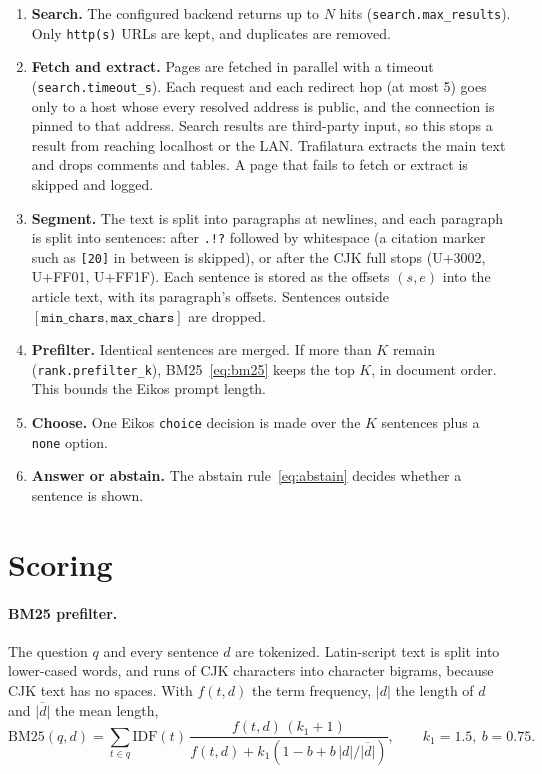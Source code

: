 \documentclass[11pt,a4paper]{article}
\newcommand{\code}[1]{\texttt{#1}}
\begin{document}
\begin{enumerate}
  \item \textbf{Search.} The configured backend returns up to $N$ hits (\code{search.max\_results}). Only
        \code{http(s)} URLs are kept, and duplicates are removed.
  \item \textbf{Fetch and extract.} Pages are fetched in parallel with a timeout (\code{search.timeout\_s}).
        Each request and each redirect hop (at most 5) goes only to a host whose every resolved address is public, and the connection is pinned to that address. Search results are third-party input, so this stops a result from reaching localhost or the LAN. Trafilatura extracts the main text and drops comments and tables. A page that fails to fetch or extract is
        skipped and logged.
  \item \textbf{Segment.} The text is split into paragraphs at newlines, and each paragraph is split into sentences:
        after \code{.!?} followed by whitespace (a citation marker such as \code{[20]} in between is skipped), or after the CJK full stops (U+3002, U+FF01, U+FF1F). Each sentence is stored as the
        offsets $(s,e)$ into the article text, with its paragraph's offsets. Sentences outside
        $[\code{min\_chars}, \code{max\_chars}]$ are dropped.
  \item \textbf{Prefilter.} Identical sentences are merged. If more than $K$ remain (\code{rank.prefilter\_k}),
        BM25~\eqref{eq:bm25} keeps the top $K$, in document order. This bounds the Eikos prompt length.
  \item \textbf{Choose.} One Eikos \code{choice} decision is made over the $K$ sentences plus a \code{none} option.
  \item \textbf{Answer or abstain.} The abstain rule~\eqref{eq:abstain} decides whether a sentence is shown.
\end{enumerate}

\section{Scoring}

\paragraph{BM25 prefilter.} The question $q$ and every sentence $d$ are tokenized. Latin-script text is split into
lower-cased words, and runs of CJK characters into character bigrams, because CJK text has no spaces. With $f(t,d)$ the
term frequency, $|d|$ the length of $d$ and $\overline{|d|}$ the mean length,
\begin{equation}
  \mathrm{BM25}(q,d)=\sum_{t\in q}\mathrm{IDF}(t)\,
  \frac{f(t,d)\,(k_1+1)}{f(t,d)+k_1\left(1-b+b\,|d|/\overline{|d|}\right)},\qquad k_1=1.5,\ b=0.75.
  \label{eq:bm25}
\end{equation}
\end{document}

